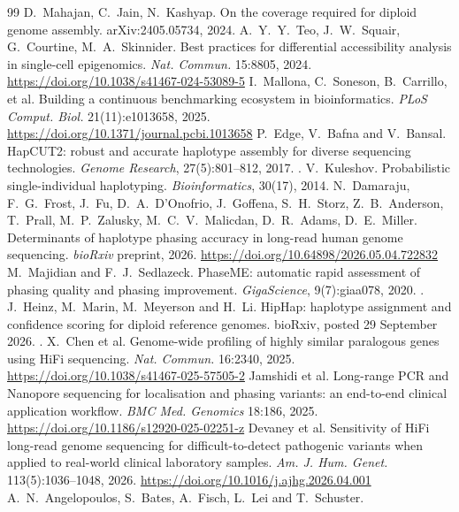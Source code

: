 \begin{thebibliography}{99}
 D.~Mahajan, C.~Jain, N.~Kashyap. On the coverage required for diploid genome assembly. arXiv:2405.05734, 2024.
 A.~Y.~Y.~Teo, J.~W.~Squair, G.~Courtine, M.~A.~Skinnider. Best practices for differential accessibility analysis in single-cell epigenomics. \emph{Nat. Commun.} 15:8805, 2024. \url{https://doi.org/10.1038/s41467-024-53089-5}
 I.~Mallona, C.~Soneson, B.~Carrillo, et al. Building a continuous benchmarking ecosystem in bioinformatics. \emph{PLoS Comput. Biol.} 21(11):e1013658, 2025. \url{https://doi.org/10.1371/journal.pcbi.1013658}
P.~Edge, V.~Bafna and V.~Bansal.
\newblock HapCUT2: robust and accurate haplotype assembly for diverse
sequencing technologies.
\newblock \emph{Genome Research}, 27(5):801--812, 2017.
\newblock {}.
V.~Kuleshov.
\newblock Probabilistic single-individual haplotyping.
\newblock \emph{Bioinformatics}, 30(17), 2014.
 N.~Damaraju, F.~G.~Frost, J.~Fu, D.~A.~D'Onofrio, J.~Goffena, S.~H.~Storz, Z.~B.~Anderson, T.~Prall, M.~P.~Zalusky, M.~C.~V.~Malicdan, D.~R.~Adams, D.~E.~Miller. Determinants of haplotype phasing accuracy in long-read human genome sequencing. \emph{bioRxiv} preprint, 2026. \url{https://doi.org/10.64898/2026.05.04.722832}
M.~Majidian and F.~J.~Sedlazeck.
\newblock PhaseME: automatic rapid assessment of phasing quality and phasing
improvement.
\newblock \emph{GigaScience}, 9(7):giaa078, 2020.
\newblock {}.
J.~Heinz, M.~Marin, M.~Meyerson and H.~Li.
\newblock HipHap: haplotype assignment and confidence scoring for diploid
reference genomes.
\newblock bioRxiv, posted 29 September 2026.
\newblock {}.
 X.~Chen et al. Genome-wide profiling of highly similar paralogous genes using HiFi sequencing. \emph{Nat. Commun.} 16:2340, 2025. \url{https://doi.org/10.1038/s41467-025-57505-2}
 Jamshidi et al. Long-range PCR and Nanopore sequencing for localisation and phasing variants: an end-to-end clinical application workflow. \emph{BMC Med. Genomics} 18:186, 2025. \url{https://doi.org/10.1186/s12920-025-02251-z}
 Devaney et al. Sensitivity of HiFi long-read genome sequencing for difficult-to-detect pathogenic variants when applied to real-world clinical laboratory samples. \emph{Am. J. Hum. Genet.} 113(5):1036--1048, 2026. \url{https://doi.org/10.1016/j.ajhg.2026.04.001}
A.~N.~Angelopoulos, S.~Bates, A.~Fisch, L.~Lei and T.~Schuster.

\end{thebibliography}

